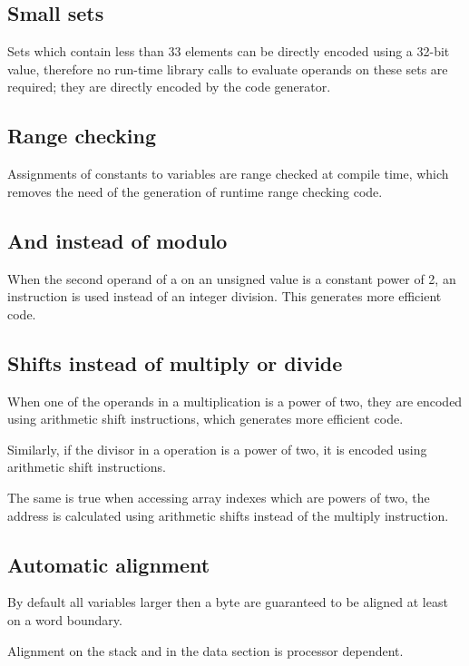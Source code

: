 \subsection{Small sets}

Sets which contain less than 33 elements can be directly encoded
using a 32-bit value, therefore no run-time library calls to
evaluate operands on these sets are required; they are directly encoded
by the code generator.

\subsection{Range checking}

Assignments of constants to variables are range checked at compile
time, which removes the need of the generation of runtime range checking
code.

\subsection{And instead of modulo}

When the second operand of a  on an unsigned value is a constant
power of 2, an  instruction is used instead of an integer division.
This generates more efficient code.

\subsection{Shifts instead of multiply or divide}

When one of the operands in a multiplication is a power of
two, they are encoded using arithmetic shift instructions,
which generates more efficient code.

Similarly, if the divisor in a  operation is a power
of two, it is encoded using arithmetic shift instructions.

The same is true when accessing array indexes which are
powers of two, the address is calculated using arithmetic
shifts instead of the multiply instruction.

\subsection{Automatic alignment}

By default all variables larger then a byte are guaranteed to be aligned
at least on a word boundary.

Alignment on the stack and in the data section is processor dependent.

